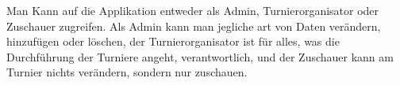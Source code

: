 Man Kann auf die Applikation entweder als Admin, Turnierorganisator oder Zuschauer zugreifen.
Als Admin kann man jegliche art von Daten verändern, hinzufügen oder löschen, der Turnierorganisator ist 
für alles, was die Durchführung der Turniere angeht, verantwortlich, und der Zuschauer 
kann am Turnier nichts verändern, sondern nur zuschauen.
\lipsum[0]
